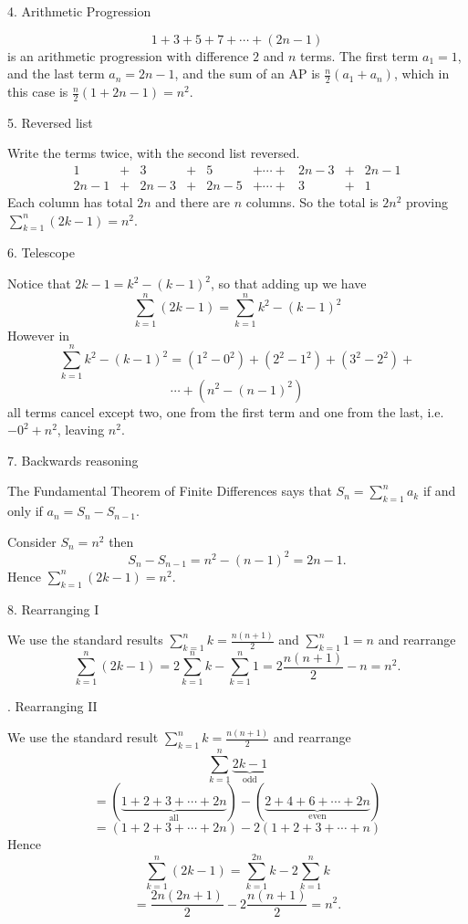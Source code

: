 \documentclass{article}
\begin{document}

 4. Arithmetic Progression

\[
1+3+5+7+\cdots+(2n-1)
\]
is an arithmetic progression with difference \(2\) and \(n\) terms. The first term \(a_1=1\), and the last term \(a_n=2n-1\), and the sum of an AP is \( \frac{n}{2}(a_1+a_n)\), which in this case is \(\frac{n}{2}(1+2n-1)=n^2\).


5. Reversed list

Write the terms twice, with the second list reversed.
\[
\begin{array}{cccccccccc}
1    & + & 3    & + & 5    & + \cdots + & 2n-3 & + & 2n-1 \\
2n-1 & + & 2n-3 & + & 2n-5 & + \cdots + &    3 & + & 1
\end{array}
\]
Each column has total \(2n\) and there are \(n\) columns.  So the total is \(2n^2\) proving \(\sum_{k=1}^n (2k-1) = n^2\).
		

6. Telescope
		
Notice that \( 2k-1 = k^2 - (k-1)^2\), so that adding up we have
\[ \sum_{k=1}^n (2k-1) = \sum_{k=1}^n k^2 - (k-1)^2\]
However in
\[ \sum_{k=1}^n k^2 - (k-1)^2 = (1^2-0^2)+(2^2-1^2)+(3^2-2^2)+\]
\[\cdots+(n^2-(n-1)^2)\]
all terms cancel except two, one from the first term and one from the last, i.e. \(-0^2+n^2\), leaving \(n^2\).


7. Backwards reasoning
		
The Fundamental Theorem of Finite Differences says that \(S_n = \sum_{k=1}^n a_k\) if and only if \(a_n = S_{n}-S_{n-1}\).

Consider \(S_n=n^2\) then \[S_n-S_{n-1}=n^2-(n-1)^2=2n-1.\]
Hence  \(\sum_{k=1}^n (2k-1) = n^2\).



8. Rearranging I
		
We use the standard results \(\sum_{k=1}^n k = \frac{n(n+1)}{2}\) and \(\sum_{k=1}^n 1 = n\) and rearrange
\[ \sum_{k=1}^n (2k-1) = 2\sum_{k=1}^n k - \sum_{k=1}^n 1 = 2\frac{n(n+1)}{2}-n = n^2.\]

. Rearranging II
	
		
We use the standard result \(\sum_{k=1}^n k = \frac{n(n+1)}{2}\) and rearrange
\[ \sum_{k=1}^n \underbrace{2k-1}_{\mbox{odd}} \]
\[=	(\underbrace{1+2+3+\cdots+2n}_{\mbox{all}}) - (\underbrace{2+4+6+\cdots +2n}_{\mbox{even}})\]
\[= (1+2+3+\cdots+2n) - 2(1+2+3+\cdots +n)\]
Hence
\[ \sum_{k=1}^n (2k-1) = \sum_{k=1}^{2n} k -  2\sum_{k=1}^{n} k\]
\[ = \frac{2n(2n+1)}{2} - 2\frac{n(n+1)}{2} = n^2.\]
\end{document}
